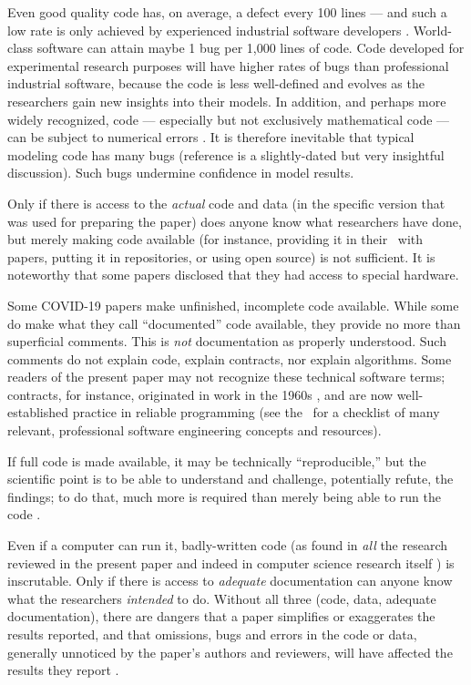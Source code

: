 Even good quality code has, on average, a defect every 100 lines --- and {such a low} rate is only achieved by experienced industrial software developers \cite{ourReview}. World-class software can attain maybe 1 bug per 1,000 lines of code. Code developed for experimental research purposes will have higher rates of bugs than professional industrial software, because the code is less well-defined and evolves as the researchers gain new insights into their models. In addition, and perhaps more widely recognized, code --- especially but not exclusively mathematical code --- can be subject to numerical errors \cite{hamming}. It is therefore inevitable that typical modeling code has many bugs (reference \cite{NVP} is a slightly-dated but very insightful discussion). Such bugs undermine confidence in model results. 

Only if there is access to the \emph{actual\/} code and data (in the specific version that was used for preparing the paper) does anyone know what researchers have done, but merely making code available (for instance, providing it in their \supplement\ with papers, putting it in repositories, or using open source) is not sufficient. It is noteworthy that some papers disclosed that they had access to special hardware.

Some COVID-19 papers  make unfinished, incomplete code available. While some  do make what they call ``documented'' code available, they provide no more than superficial comments. This is \emph{not\/} documentation as properly understood. Such comments do not explain code, explain contracts, nor explain algorithms. Some readers of the present paper may not recognize these technical software terms; contracts, for instance, originated in work in the 1960s \cite{hoare}, and are now well-established practice in reliable programming {(see the \supplement\ for a checklist of many relevant, professional software engineering concepts and resources)}.

If full code is made available, it may be technically ``reproducible,'' but the scientific point is to be able to understand and challenge, potentially refute, the findings; to do that, much more is required than merely being able to run the code \cite{notebooks,popper}.

Even if a computer can run it, badly-written code (as found in \emph{all\/} the research reviewed in the present paper {and indeed in computer science research itself \cite{machine-learning-reproducibility}}) is inscrutable. Only if there is access to \emph{adequate\/} documentation can anyone know what the researchers \emph{intended\/} to do. Without all three (code, data, adequate documentation), there are dangers that a paper simplifies or exaggerates the results reported, and that omissions, bugs and errors in the code or data, generally unnoticed by the paper's authors and reviewers, will have affected the results they report \cite{relit}. 


